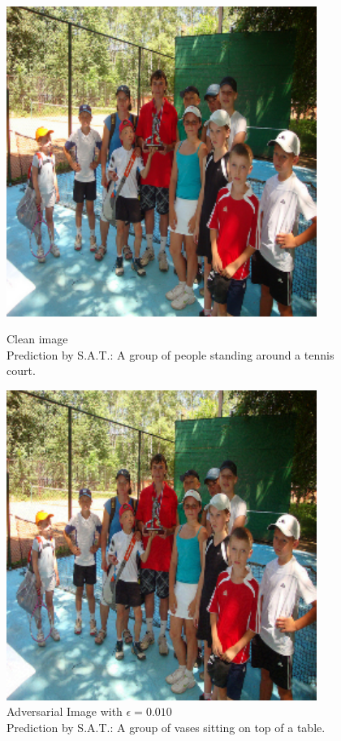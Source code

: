 \begin{figure}[ht]
    \centering
    \begin{minipage}{0.45\textwidth}
        \centering
        \includegraphics[width=0.9\textwidth]{figures/group_of_people/group_of_people_0.000.png} %
        \caption*{Clean image\\Prediction by S.A.T.: A group of people standing around a tennis court.}
    \end{minipage}\hfill
    \begin{minipage}{0.45\textwidth}
        \centering
        \includegraphics[width=0.9\textwidth]{figures/group_of_people/group_of_people_0.010.png} %
        \caption*{Adversarial Image with $\epsilon=0.010$\\Prediction by S.A.T.: A group of vases sitting on top of a table.}
    \end{minipage}
\end{figure}

